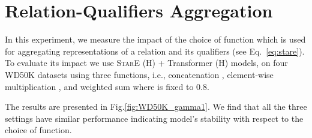 \documentclass[11pt,a4paper]{article}
\begin{document}
\section{Relation-Qualifiers Aggregation}
In this experiment, we measure the impact of the choice of  function which is used for aggregating representations of a relation and its qualifiers (see Eq.~\ref{eq:stare}). To evaluate its impact we use \textsc{StarE} (H) + Transformer (H) models, on four WD50K datasets using three functions, i.e., concatenation , element-wise multiplication , and weighted sum  where  is fixed to 0.8.



The results are presented in Fig.\ref{fig:WD50K_gamma1}.
We find that all the three settings have similar performance indicating model's stability with respect to the choice of  function. 
\end{document}
